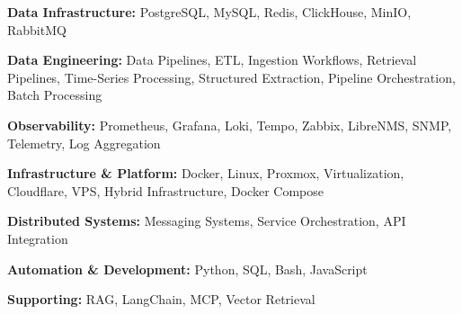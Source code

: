 \textbf{Data Infrastructure:} PostgreSQL, MySQL, Redis, ClickHouse, MinIO, RabbitMQ\par
\textbf{Data Engineering:} Data Pipelines, ETL, Ingestion Workflows, Retrieval Pipelines, Time-Series Processing, Structured Extraction, Pipeline Orchestration, Batch Processing\par
\textbf{Observability:} Prometheus, Grafana, Loki, Tempo, Zabbix, LibreNMS, SNMP, Telemetry, Log Aggregation\par
\textbf{Infrastructure \& Platform:} Docker, Linux, Proxmox, Virtualization, Cloudflare, VPS, Hybrid Infrastructure, Docker Compose\par
\textbf{Distributed Systems:} Messaging Systems, Service Orchestration, API Integration\par
\textbf{Automation \& Development:} Python, SQL, Bash, JavaScript\par
\textbf{Supporting:} RAG, LangChain, MCP, Vector Retrieval
